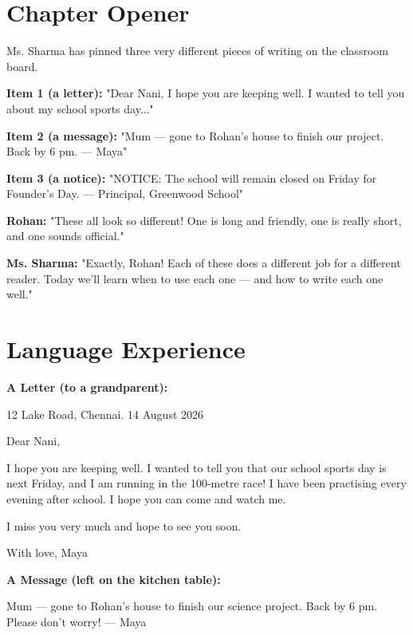 \section{Chapter Opener}
Ms. Sharma has pinned three very different pieces of writing on the classroom board.

\textbf{Item 1 (a letter):} "Dear Nani, I hope you are keeping well. I wanted to tell you about my school sports day..."

\textbf{Item 2 (a message):} "Mum — gone to Rohan's house to finish our project. Back by 6 pm. — Maya"

\textbf{Item 3 (a notice):} "NOTICE: The school will remain closed on Friday for Founder's Day. — Principal, Greenwood School"

\textbf{Rohan:} "These all look so different! One is long and friendly, one is really short, and one sounds official."

\textbf{Ms. Sharma:} "Exactly, Rohan! Each of these does a different job for a different reader. Today we'll learn when to use each one — and how to write each one well."

\section{Language Experience}
\textbf{A Letter (to a grandparent):}
\begin{tcolorbox}[colback=white, colframe=gray!20, sharp corners, boxsep=0pt, left=5pt, right=5pt, top=5pt, bottom=5pt, fontupper=\ttfamily, breakable]
12 Lake Road,
Chennai.
14 August 2026

Dear Nani,

I hope you are keeping well. I wanted to tell you that our school sports day is next Friday, and I am running in the 100-metre race! I have been practising every evening after school. I hope you can come and watch me.

I miss you very much and hope to see you soon.

With love,
Maya
\end{tcolorbox}

\textbf{A Message (left on the kitchen table):}
\begin{tcolorbox}[colback=white, colframe=gray!20, sharp corners, boxsep=0pt, left=5pt, right=5pt, top=5pt, bottom=5pt, fontupper=\ttfamily, breakable]
Mum --- gone to Rohan's house to finish our science project. Back by 6 pm. Please don't worry! --- Maya
\end{tcolorbox}

